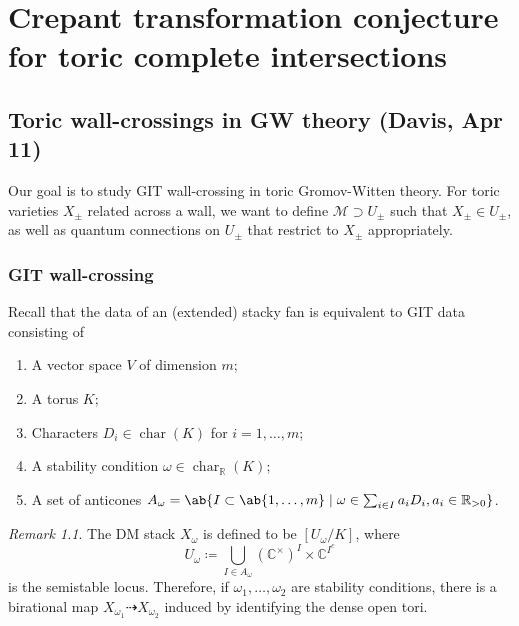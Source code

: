 \documentclass[leqno, openany]{memoir}
\theoremstyle{definition}
\theoremstyle{remark}
\newtheorem{rmk}[thm]{Remark}
\theoremstyle{plain}
\theoremstyle{definition}
\theoremstyle{remark}
\newcommand{\R}{\mathbb{R}}
\newcommand{\C}{\mathbb{C}}
\newcommand{\mc}[1]{\mathcal{#1}}
\newcommand{\on}[1]{\operatorname{#1}}
\begin{document}
\chapter{Crepant transformation conjecture for toric complete intersections}%
\label{cha:Crepant transformation conjecture for toric complete intersections}

\section{Toric wall-crossings in GW theory (Davis, Apr 11)}%
\label{sec:Toric wall-crossings}


Our goal is to study GIT wall-crossing in toric Gromov-Witten theory. For toric varieties $X_{\pm}$ related across a wall, we want to define $\mc{M} \supset U_{\pm}$ such that $X_{\pm} \in U_{\pm}$, as well as quantum connections on $U_{\pm}$ that restrict to $X_{\pm}$ appropriately.

\subsection{GIT wall-crossing}%
\label{sub:GIT wall-crossing}

Recall that the data of an (extended) stacky fan is equivalent to GIT data consisting of
\begin{enumerate}
    \item A vector space $V$ of dimension $m$;
    \item A torus $K$;
    \item Characters $D_i \in \on{char}(K)$ for $i=1,\ldots,m$;
    \item A stability condition $\omega \in \on{char}_{\R}(K)$;
    \item A set of anticones $A_{\omega} = \ab\{I \subset \ab\{1,\ldots,m\}\mid \omega \in \sum_{i\in I} a_i D_i, a_i \in \R_{>0}\}$.
\end{enumerate}

\begin{rmk}
    The DM stack $X_{\omega}$ is defined to be $[U_{\omega}/K]$, where
    \[ U_{\omega} \coloneqq \bigcup_{I \in A_{\omega}} (\C^{\times})^I \times \C^{I^c} \]
    is the semistable locus. Therefore, if $\omega_1, \ldots, \omega_2$ are stability conditions, there is a birational map $X_{\omega_1} \dashrightarrow X_{\omega_2}$ induced by identifying the dense open tori.
\end{rmk}
\end{document}
